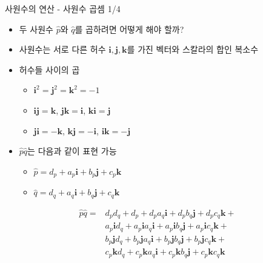 \begin{frame}[fragile]{사원수의 연산 - 사원수 곱셈 1/4}

\begin{itemize}
\item 두 사원수 $\hat{p}$와 $\hat{q}$를 곱하려면 어떻게 해야 할까?
\item 사원수는 서로 다른 허수 $\mathbf i, \mathbf j, \mathbf k$를 가진 벡터와 스칼라의 합인 복소수
\item 허수들 사이의 곱
	\begin{itemize}
	\item $\mathbf i^2 = \mathbf j^2 = \mathbf k^2 = -1$
	\item $\mathbf {ij} = \mathbf k$, $\mathbf {jk} = \mathbf i$, $\mathbf {ki} = \mathbf j$
	\item $\mathbf {ji} = -\mathbf k$, $\mathbf {kj} = -\mathbf i$, $\mathbf {ik} = -\mathbf j$
	\end{itemize}
\item $\hat{p} \hat{q}$는 다음과 같이 표현 가능
	\begin{itemize}
	\item $\hat{p}  =  d_p + a_p{\mathbf i} + b_p{\mathbf j} + c_p{\mathbf k}$
	\item $\hat{q}  =  d_q + a_q{\mathbf i} + b_q{\mathbf j} + c_q{\mathbf k}$
	\end{itemize}
\end{itemize}

\begin{eqnarray}
\hat{p}\hat{q} = &
d_p d_q + d_p + d_p a_q{\mathbf i} + d_p b_q{\mathbf j} + d_p c_q{\mathbf k} + \nonumber \\
& a_p {\mathbf i} d_q + a_p {\mathbf i}  a_q{\mathbf i} + a_p {\mathbf i} b_q{\mathbf j} + a_p {\mathbf i}  c_q{\mathbf k} + \nonumber \\
& b_p {\mathbf j} d_q + b_p {\mathbf j} a_q{\mathbf i} + b_p {\mathbf j} b_q{\mathbf j} + b_p {\mathbf j} c_q{\mathbf k} + \nonumber \\
& c_p {\mathbf k} d_q + c_p {\mathbf k} a_q{\mathbf i} + c_p {\mathbf k} b_q{\mathbf j} + c_p {\mathbf k} c_q{\mathbf k}  \nonumber
\end{eqnarray}

\end{frame}

